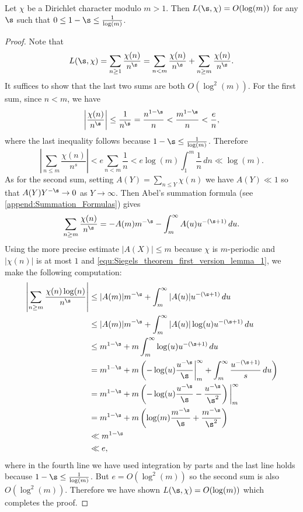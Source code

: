       \begin{lemma}\label{lem:Siegels_theorem_first_version_lemma}
        Let $\chi$ be a Dirichlet character modulo $m > 1$. Then $L(\s,\chi) = O(\log(m))$ for any $\s$ such that $0 \le 1-\s \le \frac{1}{\log(m)}$.
      \end{lemma}
      \begin{proof}
        Note that
        \[
          L(\s,\chi) = \sum_{n \ge 1}\frac{\chi(n)}{n^{\s}} = \sum_{n < m}\frac{\chi(n)}{n^{\s}}+\sum_{n \ge m}\frac{\chi(n)}{n^{\s}}.
        \]
        It suffices to show that the last two sums are both $O(\log^{2}(m))$. For the first sum, since $n < m$, we have
        \[
          \left|\frac{\chi(n)}{n^{\s}}\right| \le \frac{1}{n^{\s}} = \frac{n^{1-\s}}{n} < \frac{m^{1-\s}}{n} < \frac{e}{n},
        \]
        where the last inequality follows because $1-\s \le \frac{1}{\log(m)}$. Therefore
        \[
          \left|\sum_{n \le m}\frac{\chi(n)}{n^{s}}\right| < e\sum_{n < m}\frac{1}{n} < e\log(m)\int_{1}^{m}\frac{1}{n}\,dn \ll \log(m).
        \]
        As for the second sum, setting $A(Y) = \sum_{n \le Y}\chi(n)$ we have $A(Y) \ll 1$ so that $A(Y)Y^{-\s} \to 0$ as $Y \to \infty$. Then Abel's summation formula (see \cref{append:Summation_Formulas}) gives
        \begin{equation}\label{equ:Siegels_theorem_first_version_lemma_1}
          \sum_{n \ge m}\frac{\chi(n)}{n^{\s}} = -A(m)m^{-\s}-\int_{m}^{\infty}A(u)u^{-(\s+1)}\,du.
        \end{equation}
        Using the more precise estimate $|A(X)| \le m$ because $\chi$ is $m$-periodic and $|\chi(n)|$ is at most $1$ and \cref{equ:Siegels_theorem_first_version_lemma_1}, we make the following computation:
        \begin{align*}
          \left|\sum_{n \ge m}\frac{\chi(n)\log(n)}{n^{\s}}\right| &\le |A(m)|m^{-\s}+\int_{m}^{\infty}|A(u)|u^{-(\s+1)}\,du \\
          &\le |A(m)|m^{-\s}+\int_{m}^{\infty}|A(u)|\log(u)u^{-(\s+1)}\,du \\
          &\le m^{1-\s}+m\int_{m}^{\infty}\log(u)u^{-(\s+1)}\,du \\
          &= m^{1-\s}+m\left(-\log(u)\frac{u^{-\s}}{\s}\bigg|_{m}^{\infty}+\int_{m}^{\infty}\frac{u^{-(\s+1)}}{s}\,du\right) \\
          &= m^{1-\s}+m\left(-\log(u)\frac{u^{-\s}}{\s}-\frac{u^{-\s}}{\s^{2}}\right)\bigg|_{m}^{\infty} \\
          &= m^{1-\s}+m\left(\log(m)\frac{m^{-\s}}{\s}+\frac{m^{-\s}}{\s^{2}}\right) \\
          &\ll m^{1-\s} \\
          &\ll e,
        \end{align*}
        where in the fourth line we have used integration by parts and the last line holds because $1-\s \le \frac{1}{\log(m)}$. But $e = O(\log^{2}(m))$ so the second sum is also $O(\log^{2}(m))$. Therefore we have shown $L(\s,\chi) = O(\log(m))$ which completes the proof.
      \end{proof}


